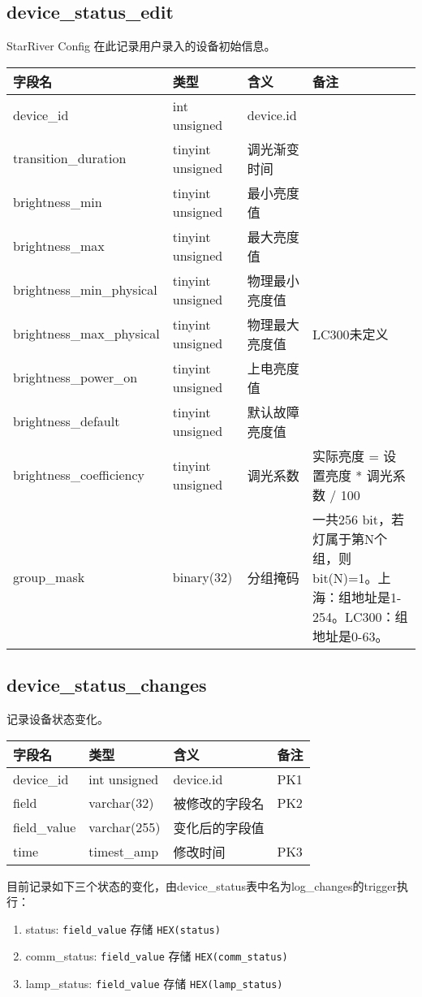 \subsection{device\_status\_edit}\label{deviceux5fstatusux5fedit}

StarRiver Config 在此记录用户录入的设备初始信息。

\begin{longtabu}[c]{@{}lXXX@{}}
\toprule
字段名 & 类型 & 含义 & 备注\tabularnewline
\midrule
\endhead
device\_id & int unsigned & device.id &\tabularnewline
transition\_duration & tinyint unsigned & 调光渐变时间 &\tabularnewline
brightness\_min & tinyint unsigned & 最小亮度值 &\tabularnewline
brightness\_max & tinyint unsigned & 最大亮度值 &\tabularnewline
brightness\_min\_physical & tinyint unsigned & 物理最小亮度值
&\tabularnewline
brightness\_max\_physical & tinyint unsigned & 物理最大亮度值 &
LC300未定义\tabularnewline
brightness\_power\_on & tinyint unsigned & 上电亮度值 &\tabularnewline
brightness\_default & tinyint unsigned & 默认故障亮度值 &\tabularnewline
brightness\_coefficiency & tinyint unsigned & 调光系数 & 实际亮度 =
设置亮度 * 调光系数 / 100\tabularnewline
group\_mask & binary(32) & 分组掩码 & 一共256
bit，若灯属于第N个组，则bit(N)=1。上海：组地址是1-254。LC300：组地址是0-63。\tabularnewline
\bottomrule
\end{longtabu}

\subsection{device\_status\_changes}\label{deviceux5fstatusux5fchanges}

记录设备状态变化。

\begin{longtabu}[c]{@{}lXXX@{}}
\toprule
字段名 & 类型 & 含义 & 备注\tabularnewline
\midrule
\endhead
device\_id & int unsigned & device.id & PK1\tabularnewline
field & varchar(32) & 被修改的字段名 & PK2\tabularnewline
field\_value & varchar(255) & 变化后的字段值 &\tabularnewline
time & timest\_amp & 修改时间 & PK3\tabularnewline
\bottomrule
\end{longtabu}

目前记录如下三个状态的变化，由device\_status表中名为log\_changes的trigger执行：

\begin{enumerate}
\def\labelenumi{\arabic{enumi}.}
\itemsep1pt\parskip0pt
\item
  status: \texttt{field\_value} 存储 \texttt{HEX(status)}
\item
  comm\_status: \texttt{field\_value} 存储 \texttt{HEX(comm\_status)}
\item
  lamp\_status: \texttt{field\_value} 存储 \texttt{HEX(lamp\_status)}
\end{enumerate}

